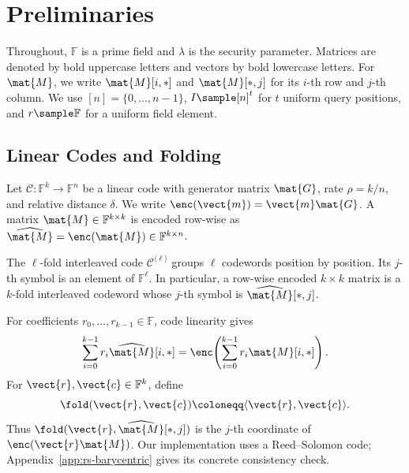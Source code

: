 \section{Preliminaries}
\label{sec:prelim}

Throughout, \(\mathbb{F}\) is a prime field and \(\lambda\) is the security
parameter.  Matrices are denoted by bold uppercase letters and vectors by bold
lowercase letters.  For \(\mat{M}\), we write \(\mat{M}[i,*]\) and
\(\mat{M}[*,j]\) for its \(i\)-th row and \(j\)-th column.  We use
\([n]=\{0,\ldots,n-1\}\), \(I\sample[n]^t\) for \(t\) uniform query
positions, and \(r\sample\mathbb{F}\) for a uniform field element.

\subsection{Linear Codes and Folding}
\label{sec:prelim-codes}

Let \(\mathcal{C}:\mathbb{F}^k\to\mathbb{F}^n\) be a linear code with
generator matrix \(\mat{G}\), rate \(\rho=k/n\), and relative distance
\(\delta\).  We write \(\enc(\vect{m})=\vect{m}\mat{G}\).  A matrix
\(\mat{M}\in\mathbb{F}^{k\times k}\) is encoded row-wise as
\(\widehat{\mat{M}}=\enc(\mat{M})\in\mathbb{F}^{k\times n}\).

\begin{definition}\label{def:interleaved-code}
The \(\ell\)-fold interleaved code \(\mathcal{C}^{\langle\ell\rangle}\)
groups \(\ell\) codewords position by position.  Its \(j\)-th symbol is an
element of \(\mathbb{F}^{\ell}\).  In particular, a row-wise encoded
\(k\times k\) matrix is a \(k\)-fold interleaved codeword whose \(j\)-th
symbol is \(\widehat{\mat{M}}[*,j]\).
\end{definition}

For coefficients \(r_0,\ldots,r_{k-1}\in\mathbb{F}\), code linearity gives
\begin{equation}\label{eq:code-linearity}
  \sum_{i=0}^{k-1}r_i\widehat{\mat{M}}[i,*]
  =\enc\!\left(\sum_{i=0}^{k-1}r_i\mat{M}[i,*]\right).
\end{equation}
For \(\vect{r},\vect{c}\in\mathbb{F}^k\), define
\begin{equation}\label{def:fold}
  \fold(\vect{r},\vect{c})\coloneqq
  \langle\vect{r},\vect{c}\rangle.
\end{equation}
Thus \(\fold(\vect{r},\widehat{\mat{M}}[*,j])\) is the \(j\)-th coordinate
of \(\enc(\vect{r}\mat{M})\).  Our implementation uses a Reed--Solomon code;
Appendix~\ref{app:rs-barycentric} gives its concrete consistency check.

